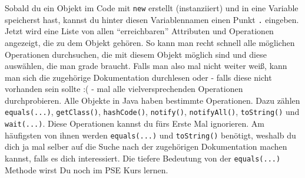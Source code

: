 \begin{Infobox}[Autocompletion]
	\label{autocompletions}
    Sobald du ein Objekt im Code mit \lstinline{new} erstellt (instanziiert) und in eine Variable speicherst hast, kannst du hinter diesen Variablennamen einen Punkt \lstinline{.} eingeben.\newline
    Jetzt wird eine Liste von allen \enquote{erreichbaren} Attributen und Operationen angezeigt, die zu dem Objekt gehören.
    So kann man recht schnell alle möglichen Operationen durchsuchen, die mit diesem Objekt möglich sind und diese auswählen, die man grade braucht.\newline
	Falls man also mal nicht weiter weiß, kann man sich die zugehörige Dokumentation durchlesen oder - falls diese nicht vorhanden sein sollte :( - mal alle vielversprechenden Operationen durchprobieren.\newline
    Alle Objekte in Java haben bestimmte Operationen. Dazu zählen \lstinline{equals(...)}, \lstinline{getClass()}, \lstinline{hashCode()}, \lstinline{notify()}, \lstinline{notifyAll()}, \lstinline{toString()} und \lstinline{wait(...)}. Diese Operationen kannst du fürs Erste Mal ignorieren.\newline
    Am häufigsten von ihnen werden \lstinline{equals(...)} und \lstinline{toString()} benötigt, weshalb du dich ja mal selber auf die Suche nach der zugehörigen Dokumentation machen kannst, falls es dich interessiert. Die tiefere Bedeutung von der \lstinline{equals(...)} Methode wirst Du noch im PSE Kurs lernen.
\end{Infobox}


